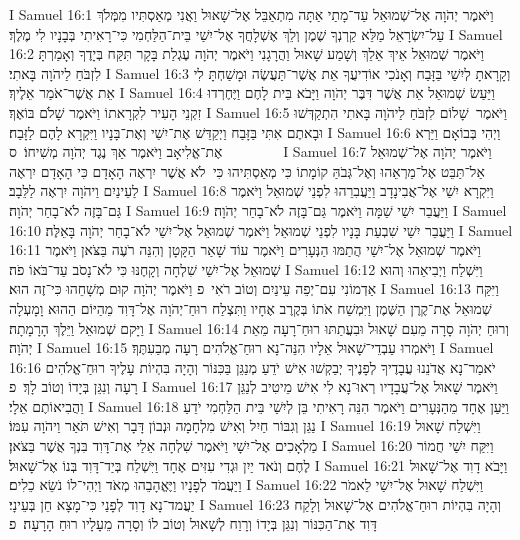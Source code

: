 I Samuel 16:1	וַיֹּאמֶר יְהֹוָה אֶל־שְׁמוּאֵל עַד־מָתַי אַתָּה מִתְאַבֵּל אֶל־שָׁאוּל וַאֲנִי מְאַסְתִּיו מִמְּלֹךְ עַל־יִשְׂרָאֵל מַלֵּא קַרְנְךָ שֶׁמֶן וְלֵךְ אֶשְׁלָחֲךָ אֶל־יִשַׁי בֵּית־הַלַּחְמִי כִּי־רָאִיתִי בְּבָנָיו לִי מֶלֶךְ׃
I Samuel 16:2	וַיֹּאמֶר שְׁמוּאֵל אֵיךְ אֵלֵךְ וְשָׁמַע שָׁאוּל וַהֲרָגָנִי וַיֹּאמֶר יְהֹוָה עֶגְלַת בָּקָר תִּקַּח בְּיָדֶךָ וְאָמַרְתָּ לִזְבֹּחַ לַיהֹוָה בָּאתִי׃
I Samuel 16:3	וְקָרָאתָ לְיִשַׁי בַּזָּבַח וְאָנֹכִי אוֹדִיעֲךָ אֵת אֲשֶׁר־תַּעֲשֶׂה וּמָשַׁחְתָּ לִי אֵת אֲשֶׁר־אֹמַר אֵלֶיךָ׃
I Samuel 16:4	וַיַּעַשׂ שְׁמוּאֵל אֵת אֲשֶׁר דִּבֶּר יְהֹוָה וַיָּבֹא בֵּית לָחֶם וַיֶּחֶרְדוּ זִקְנֵי הָעִיר לִקְרָאתוֹ וַיֹּאמֶר שָׁלֹם בּוֹאֶךָ׃
I Samuel 16:5	וַיֹּאמֶר  שָׁלוֹם לִזְבֹּחַ לַיהֹוָה בָּאתִי הִתְקַדְּשׁוּ וּבָאתֶם אִתִּי בַּזָּבַח וַיְקַדֵּשׁ אֶת־יִשַׁי וְאֶת־בָּנָיו וַיִּקְרָא לָהֶם לַזָּבַח׃
I Samuel 16:6	וַיְהִי בְּבוֹאָם וַיַּרְא אֶת־אֱלִיאָב וַיֹּאמֶר אַךְ נֶגֶד יְהֹוָה מְשִׁיחוֹ׃ {ס}        
I Samuel 16:7	וַיֹּאמֶר יְהֹוָה אֶל־שְׁמוּאֵל אַל־תַּבֵּט אֶל־מַרְאֵהוּ וְאֶל־גְּבֹהַּ קוֹמָתוֹ כִּי מְאַסְתִּיהוּ כִּי  לֹא אֲשֶׁר יִרְאֶה הָאָדָם כִּי הָאָדָם יִרְאֶה לַעֵינַיִם וַיהֹוָה יִרְאֶה לַלֵּבָב׃
I Samuel 16:8	וַיִּקְרָא יִשַׁי אֶל־אֲבִינָדָב וַיַּעֲבִרֵהוּ לִפְנֵי שְׁמוּאֵל וַיֹּאמֶר גַּם־בָּזֶה לֹא־בָחַר יְהֹוָה׃
I Samuel 16:9	וַיַּעֲבֵר יִשַׁי שַׁמָּה וַיֹּאמֶר גַּם־בָּזֶה לֹא־בָחַר יְהֹוָה׃
I Samuel 16:10	וַיַּעֲבֵר יִשַׁי שִׁבְעַת בָּנָיו לִפְנֵי שְׁמוּאֵל וַיֹּאמֶר שְׁמוּאֵל אֶל־יִשַׁי לֹא־בָחַר יְהֹוָה בָּאֵלֶּה׃
I Samuel 16:11	וַיֹּאמֶר שְׁמוּאֵל אֶל־יִשַׁי הֲתַמּוּ הַנְּעָרִים וַיֹּאמֶר עוֹד שָׁאַר הַקָּטָן וְהִנֵּה רֹעֶה בַּצֹּאן וַיֹּאמֶר שְׁמוּאֵל אֶל־יִשַׁי שִׁלְחָה וְקָחֶנּוּ כִּי לֹא־נָסֹב עַד־בֹּאוֹ פֹה׃
I Samuel 16:12	וַיִּשְׁלַח וַיְבִיאֵהוּ וְהוּא אַדְמוֹנִי עִם־יְפֵה עֵינַיִם וְטוֹב רֹאִי {פ} וַיֹּאמֶר יְהֹוָה קוּם מְשָׁחֵהוּ כִּי־זֶה הוּא׃
I Samuel 16:13	וַיִּקַּח שְׁמוּאֵל אֶת־קֶרֶן הַשֶּׁמֶן וַיִּמְשַׁח אֹתוֹ בְּקֶרֶב אֶחָיו וַתִּצְלַח רוּחַ־יְהֹוָה אֶל־דָּוִד מֵהַיּוֹם הַהוּא וָמָעְלָה וַיָּקם שְׁמוּאֵל וַיֵּלֶךְ הָרָמָתָה׃
I Samuel 16:14	וְרוּחַ יְהֹוָה סָרָה מֵעִם שָׁאוּל וּבִעֲתַתּוּ רוּחַ־רָעָה מֵאֵת יְהֹוָה׃
I Samuel 16:15	וַיֹּאמְרוּ עַבְדֵי־שָׁאוּל אֵלָיו הִנֵּה־נָא רוּחַ־אֱלֹהִים רָעָה מְבַעִתֶּךָ׃
I Samuel 16:16	יֹאמַר־נָא אֲדֹנֵנוּ עֲבָדֶיךָ לְפָנֶיךָ יְבַקְשׁוּ אִישׁ יֹדֵעַ מְנַגֵּן בַּכִּנּוֹר וְהָיָה בִּהְיוֹת עָלֶיךָ רוּחַ־אֱלֹהִים רָעָה וְנִגֵּן בְּיָדוֹ וְטוֹב לָךְ׃ {פ}
I Samuel 16:17	וַיֹּאמֶר שָׁאוּל אֶל־עֲבָדָיו רְאוּ־נָא לִי אִישׁ מֵיטִיב לְנַגֵּן וַהֲבִיאוֹתֶם אֵלָי׃
I Samuel 16:18	וַיַּעַן אֶחָד מֵהַנְּעָרִים וַיֹּאמֶר הִנֵּה רָאִיתִי בֵּן לְיִשַׁי בֵּית הַלַּחְמִי יֹדֵעַ נַגֵּן וְגִבּוֹר חַיִל וְאִישׁ מִלְחָמָה וּנְבוֹן דָּבָר וְאִישׁ תֹּאַר וַיהֹוָה עִמּוֹ׃
I Samuel 16:19	וַיִּשְׁלַח שָׁאוּל מַלְאָכִים אֶל־יִשָׁי וַיֹּאמֶר שִׁלְחָה אֵלַי אֶת־דָּוִד בִּנְךָ אֲשֶׁר בַּצֹּאן׃
I Samuel 16:20	וַיִּקַּח יִשַׁי חֲמוֹר לֶחֶם וְנֹאד יַיִן וּגְדִי עִזִּים אֶחָד וַיִּשְׁלַח בְּיַד־דָּוִד בְּנוֹ אֶל־שָׁאוּל׃
I Samuel 16:21	וַיָּבֹא דָוִד אֶל־שָׁאוּל וַיַּעֲמֹד לְפָנָיו וַיֶּאֱהָבֵהוּ מְאֹד וַיְהִי־לוֹ נֹשֵׂא כֵלִים׃
I Samuel 16:22	וַיִּשְׁלַח שָׁאוּל אֶל־יִשַׁי לֵאמֹר יַעֲמד־נָא דָוִד לְפָנַי כִּי־מָצָא חֵן בְּעֵינָי׃
I Samuel 16:23	וְהָיָה בִּהְיוֹת רוּחַ־אֱלֹהִים אֶל־שָׁאוּל וְלָקַח דָּוִד אֶת־הַכִּנּוֹר וְנִגֵּן בְּיָדוֹ וְרָוַח לְשָׁאוּל וְטוֹב לוֹ וְסָרָה מֵעָלָיו רוּחַ הָרָעָה׃ {פ}
